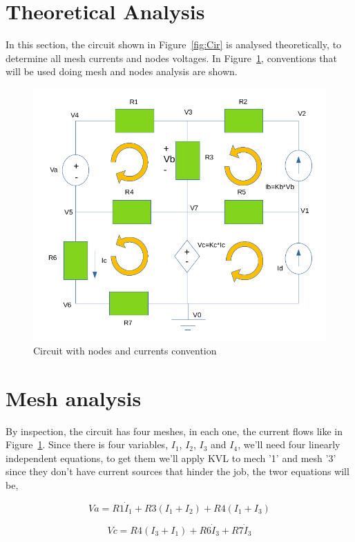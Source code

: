 \section{Theoretical Analysis}
\label{sec:analysis}

In this section, the circuit shown in Figure~\ref{fig:Cir} is analysed
theoretically, to determine all mesh currents and nodes voltages.
In Figure~\ref{fig:Cir_teo}, conventions that will be used doing mesh and nodes analysis are shown.

\begin{figure}[h] \centering
\includegraphics[width=0.8\linewidth]{Esquema_teor.png}
\caption{Circuit with nodes and currents convention}
\label{fig:Cir_teo}
\end{figure}

\section{Mesh analysis}

By inspection, the circuit has four meshes, in each one, the current flows like in Figure~\ref{fig:Cir_teo}. Since there is four variables, $I_1$, $I_2$, $I_3$ and $I_4$, we'll need four linearly independent equations, to get them we'll apply KVL to mech '1' and mesh '3' since they don't have current sources that hinder the job, the twor equations will be,

\begin{equation}
  Va = R1 \dot I_1+R3(I_1 + I_2) + R4(I_1 + I_3)
  \label{eq:KVL1}
\end{equation}

\begin{equation}
  Vc = R4(I_3 + I_1) + R6 \dot I_3 + R7 \dot I_3
  \label{eq:KVL3}
\end{equation}

